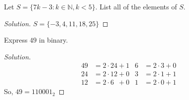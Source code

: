 \documentclass[crop=false,class=book,oneside]{standalone}
\begin{document}
    \begin{problem}
    Let $S = \{7k-3: k \in \mathbb{N}, k < 5\}$. List all of the elements of $S$.
    \end{problem}
    \begin{proof}[Solution]
    \vspace{-0.5\topsep}
    $S = \{-3,4,11,18,25\}$
    \end{proof}
    \begin{problem}
    Express $49$ in binary.
    \end{problem}
    \begin{proof}[Solution]
    \vspace{-\topsep}
    \
    \begin{align*}
        49 &= 2\cdot24+1 & 6&=2\cdot3+0\\
        24&= 2\cdot12+0 & 3&=2\cdot1+1\\
        12&= 2\cdot6\phantom{2}+0 & 1&=2\cdot0+1
    \end{align*}
    So, $49 = 110001_{2}$
    \end{proof} 
\end{document}
